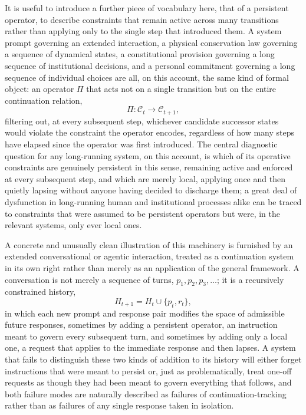 \documentclass[11pt]{article}
\begin{document}
It is useful to introduce a further piece of vocabulary here, that of a persistent operator, to describe constraints that remain active across many transitions rather than applying only to the single step that introduced them. A system prompt governing an extended interaction, a physical conservation law governing a sequence of dynamical states, a constitutional provision governing a long sequence of institutional decisions, and a personal commitment governing a long sequence of individual choices are all, on this account, the same kind of formal object: an operator $\Pi$ that acts not on a single transition but on the entire continuation relation,
$$\Pi: \mathcal{C}_t \to \mathcal{C}_{t+1},$$
filtering out, at every subsequent step, whichever candidate successor states would violate the constraint the operator encodes, regardless of how many steps have elapsed since the operator was first introduced. The central diagnostic question for any long-running system, on this account, is which of its operative constraints are genuinely persistent in this sense, remaining active and enforced at every subsequent step, and which are merely local, applying once and then quietly lapsing without anyone having decided to discharge them; a great deal of dysfunction in long-running human and institutional processes alike can be traced to constraints that were assumed to be persistent operators but were, in the relevant systems, only ever local ones.

A concrete and unusually clean illustration of this machinery is furnished by an extended conversational or agentic interaction, treated as a continuation system in its own right rather than merely as an application of the general framework. A conversation is not merely a sequence of turns, $p_1, p_2, p_3, \ldots$; it is a recursively constrained history,
$$H_{t+1} = H_t \cup \{p_t, r_t\},$$
in which each new prompt and response pair modifies the space of admissible future responses, sometimes by adding a persistent operator, an instruction meant to govern every subsequent turn, and sometimes by adding only a local one, a request that applies to the immediate response and then lapses. A system that fails to distinguish these two kinds of addition to its history will either forget instructions that were meant to persist or, just as problematically, treat one-off requests as though they had been meant to govern everything that follows, and both failure modes are naturally described as failures of continuation-tracking rather than as failures of any single response taken in isolation.
\end{document}
